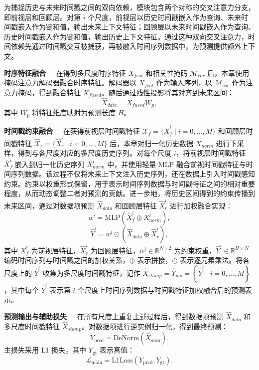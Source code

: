 为捕捉历史与未来时间戳之间的双向依赖，模块包含两个对称的交叉注意力分支，即前视层和回顾层。对第 $i$ 个尺度，前视层以历史时间戳嵌入作为查询、未来时间戳嵌入作为键和值，输出未来上下文特征；回顾层以未来时间戳嵌入作为查询、历史时间戳嵌入作为键和值，输出历史上下文特征。通过这种双向交叉注意力，时间依赖先通过时间戳交互被捕获，再被融入时间序列数据中，为预测提供额外上下文。

\noindent\textbf{时序特征融合\ \ } 在得到多尺度时序特征 $X_{feat}$ 和相关性掩码 $\mathcal{M}_{{cor}}$ 后，本章使用掩码注意力解码器融合时序特征。解码器以 $X_{feat}$ 作为输入序列，以 $\mathcal{M}_{{cor}}$ 作为注意力掩码，得到融合特征 $X_{fused}$。随后通过线性投影将其对齐到未来区间：
\begin{equation}
\hat{X}_{data}=X_{fused}{W}_p,
\end{equation}
其中 ${W}_p$ 将特征维度映射为预测长度 $H$。

\noindent\textbf{时间戳约束融合\ \ } 在获得前视层时间戳特征 $\bar{\mathcal{X}}_f=\{\bar{X}_f^{i}\mid i=0,\ldots,M\}$ 和回顾层时间戳特征 $\hat{\mathcal{X}}_r=\{\hat{X}_r^{i}\mid i=0,\ldots,M\}$ 后，本章对归一化历史数据 $X_{norm}$ 进行下采样，得到与各尺度对应的多尺度历史序列。对每个尺度 $i$，将前视层时间戳特征 $\bar{X}_f^{i}$ 嵌入到归一化历史序列 $X_{norm}^{i}$ 中，并使用轻量 MLP 融合前视时间戳特征与时间序列数据。该过程不仅将未来上下文注入历史序列，还在数据上引入时间戳感知约束。约束以权重形式保留，用于表示时间序列数据与时间戳特征之间的相对重要程度，从而动态调整二者对预测的贡献。进一步地，将历史区间得到的约束传播到未来区间，通过对数据项预测 $\hat{X}_{data}$ 和回顾层特征 $\hat{X}_r^{i}$ 进行加权融合实现：
\begin{equation}
{w}^{i}=\mathrm{MLP}\!\left(\bar{X}_f^{i}\oplus{X}_{norm}^{i}\right),
\end{equation}
\begin{equation}
\hat{Y}^{i}={w}^{i}\odot\left(\hat{X}_{data}\oplus\hat{X}_r^{i}\right),
\end{equation}
其中 $\bar{X}_f^{i}$ 为前视层特征，$\hat{X}_r^{i}$ 为回顾层特征，${w}^{i}\in\mathbb{R}^{N\times 2}$ 为约束权重，$\hat{Y}^{i}\in\mathbb{R}^{H\times N}$ 编码时间序列与时间戳之间的加权关系，$\oplus$ 表示拼接，$\odot$ 表示逐元素乘法。将各尺度上的 $\hat{Y}^{i}$ 收集为多尺度时间戳特征，记作 $\hat{X}_{stamp}=\hat{Y}_{ms}=\left\{\hat{Y}^{i}\mid i=0,\ldots,M\right\}$，其中每个 $\hat{Y}^{i}$ 表示第 $i$ 个尺度上时间序列数据与时间戳特征加权融合后的预测表示。

\noindent\textbf{预测输出与辅助损失\ \ } 在所有尺度上重复上述过程后，得到数据项预测 $\hat{X}_{data}$ 和多尺度时间戳特征 $\hat{X}_{stamp}$。对数据项进行逆实例归一化，得到最终预测：
\begin{equation}
Y_\mathrm{pred}=\mathrm{DeNorm}\!\left(\hat{X}_{data}\right).
\end{equation}
主损失采用 L1 损失，其中 $Y_\mathrm{gt}$ 表示真值：
\begin{equation}
\mathcal{L}_{\mathrm{main}}=\mathrm{L1Loss}\!\left(Y_\mathrm{pred},Y_\mathrm{gt}\right).
\end{equation}

